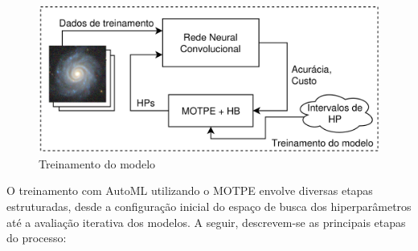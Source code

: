 \begin{figure}[!ht]
  \centering
  \includegraphics[width=\linewidth]{figures/treinamento.png}
  \caption{Treinamento do modelo}
  \label{fig:treinamento}
\end{figure}

O treinamento com AutoML utilizando o MOTPE envolve diversas etapas estruturadas, desde a configuração inicial do espaço de busca dos hiperparâmetros até a avaliação iterativa dos modelos. A seguir, descrevem-se as principais etapas do processo:

